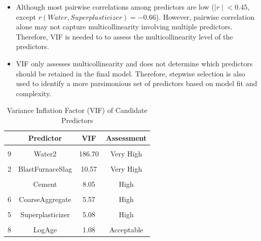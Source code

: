 \documentclass[
  11pt,
]{article}
\begin{document}
\begin{itemize}
\item
  Although most pairwise correlations among predictors are low
  (\(|r∣<0.45\), except \(r(Water, Superplasticizer)=−0.66\)). However,
  pairwise correlation alone may not capture multicollinearity involving
  multiple predictors. Therefore, VIF is needed to to assess the
  multicollinearity level of the predictors.
\item
  VIF only assesses multicollinearity and does not determine which
  predictors should be retained in the final model. Therefore, stepwise
  selection is also used to identify a more parsimonious set of
  predictors based on model fit and complexity.
\end{itemize}

\begin{table}[!h]
\centering
\caption{\label{tab:vif}Variance Inflation Factor (VIF) of Candidate Predictors}
\centering
\fontsize{10}{12}\selectfont
\begin{tabular}[t]{lccc}
\toprule
\textbf{ } & \textbf{Predictor} & \textbf{VIF} & \textbf{Assessment}\\
\midrule
\cellcolor{gray!10}{4} & \cellcolor{gray!10}{Water} & \cellcolor{gray!10}{187.87} & \cellcolor{gray!10}{Very High}\\
9 & Water2 & 186.70 & Very High\\
\cellcolor{gray!10}{3} & \cellcolor{gray!10}{FlyAsh} & \cellcolor{gray!10}{15.94} & \cellcolor{gray!10}{Very High}\\
2 & BlastFurnaceSlag & 10.57 & Very High\\
\cellcolor{gray!10}{11} & \cellcolor{gray!10}{FlyAshPresent} & \cellcolor{gray!10}{10.55} & \cellcolor{gray!10}{Very High}\\
\addlinespace
1 & Cement & 8.05 & High\\
\cellcolor{gray!10}{7} & \cellcolor{gray!10}{FineAggregate} & \cellcolor{gray!10}{7.58} & \cellcolor{gray!10}{High}\\
6 & CoarseAggregate & 5.57 & High\\
\cellcolor{gray!10}{12} & \cellcolor{gray!10}{SuperplasticizerPresent} & \cellcolor{gray!10}{5.13} & \cellcolor{gray!10}{High}\\
5 & Superplasticizer & 5.08 & High\\
\addlinespace
\cellcolor{gray!10}{10} & \cellcolor{gray!10}{SlagPresent} & \cellcolor{gray!10}{3.41} & \cellcolor{gray!10}{Acceptable}\\
8 & LogAge & 1.08 & Acceptable\\
\bottomrule
\end{tabular}
\end{table}
\end{document}
